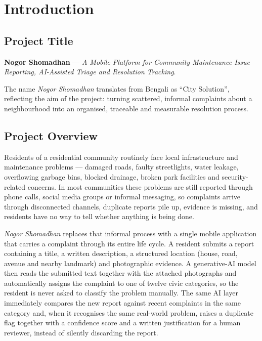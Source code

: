 \documentclass[11pt,a4paper]{article}
\begin{document}
\section{Introduction}

\subsection{Project Title}

\textbf{Nogor Shomadhan} --- \emph{A Mobile Platform for Community Maintenance
Issue Reporting, AI-Assisted Triage and Resolution Tracking}.

The name \emph{Nogor Shomadhan} translates from Bengali as ``City Solution'',
reflecting the aim of the project: turning scattered, informal complaints about a
neighbourhood into an organised, traceable and measurable resolution process.

\subsection{Project Overview}

Residents of a residential community routinely face local infrastructure and
maintenance problems --- damaged roads, faulty streetlights, water leakage,
overflowing garbage bins, blocked drainage, broken park facilities and
security-related concerns. In most communities these problems are still reported
through phone calls, social media groups or informal messaging, so complaints
arrive through disconnected channels, duplicate reports pile up, evidence is
missing, and residents have no way to tell whether anything is being done.

\emph{Nogor Shomadhan} replaces that informal process with a single mobile
application that carries a complaint through its entire life cycle. A resident
submits a report containing a title, a written description, a structured location
(house, road, avenue and nearby landmark) and photographic evidence. A
generative-AI model then reads the submitted text together with the attached
photographs and automatically assigns the complaint to one of twelve civic
categories, so the resident is never asked to classify the problem manually. The
same AI layer immediately compares the new report against recent complaints in
the same category and, when it recognises the same real-world problem, raises a
duplicate flag together with a confidence score and a written justification for a
human reviewer, instead of silently discarding the report.
\end{document}
